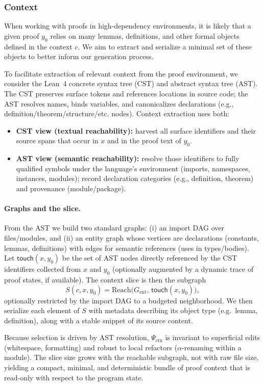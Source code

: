 \subsubsection{Context}
\label{sec:context_extraction}
When working with proofs in high-dependency environments, it is likely that a given proof $y_0$ relies on many lemmas, definitions, and other formal objects defined in the context $c$. We aim to extract and serialize a minimal set of these objects to better inform our generation process.

To facilitate extraction of relevant context from the proof environment, we consider the Lean~4 concrete syntax tree (CST) and abstract syntax tree (AST). The CST preserves surface tokens and references locations in source code; the AST resolves names, binds variables, and canonicalizes declarations (e.g., definition/theorem/structure/etc. nodes). Context extraction uses both:
\begin{itemize}
    \item \textbf{CST view (textual reachability):} harvest all surface identifiers and their source spans that occur in $x$ and in the proof text of $y_0$.
    \item \textbf{AST view (semantic reachability):} resolve those identifiers to fully qualified symbols under the language's environment (imports, namespaces, instances, modules); record declaration categories (e.g., definition, theorem) and provenance (module/package).
\end{itemize}

\paragraph{Graphs and the slice.}
From the AST we build two standard graphs: (i) an import DAG over files/modules, and (ii) an entity graph whose vertices are declarations (constants, lemmas, definitions) with edges for semantic references (uses in types/bodies). Let $\mathsf{touch}(x,y_0)$ be the set of AST nodes directly referenced by the CST identifiers collected from $x$ and $y_0$ (optionally augmented by a dynamic trace of proof states, if available). The context slice is then the subgraph
\[S(c,x,y_0) = \mathrm{Reach}\big(G_{\mathrm{ent}},\,\mathsf{touch}(x,y_0)\big),\]
optionally restricted by the import DAG to a budgeted neighborhood. We then serialize each element of $S$ with metadata describing its object type (e.g.\ lemma, definition), along with a stable snippet of its source content.

Because selection is driven by AST resolution, $\Psi_{\text{ctx}}$ is invariant to superficial edits (whitespace, formatting) and robust to local refactors ($\alpha$-renaming within a module). The slice size grows with the reachable subgraph, not with raw file size, yielding a compact, minimal, and deterministic bundle of proof context that is read-only with respect to the program state.


